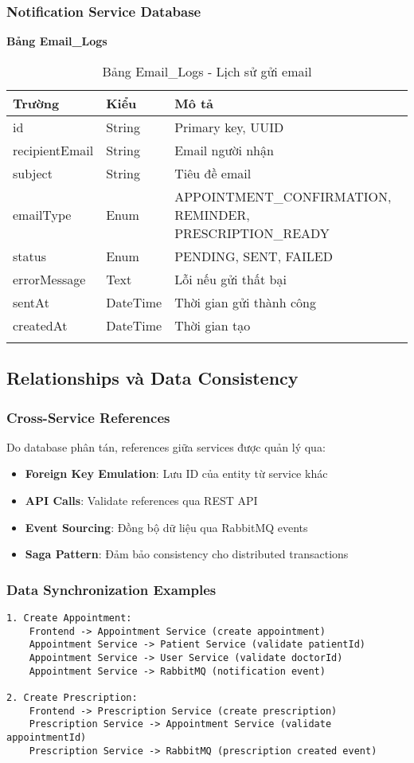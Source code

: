 \documentclass[12pt,a4paper]{report}
\begin{document}
\subsubsection{Notification Service Database}
\textbf{Bảng Email\_Logs}
\begin{longtable}{|p{3cm}|p{2cm}|p{8cm}|}
\hline
\textbf{Trường} & \textbf{Kiểu} & \textbf{Mô tả} \\
\hline
id & String & Primary key, UUID \\
\hline
recipientEmail & String & Email người nhận \\
\hline
subject & String & Tiêu đề email \\
\hline
emailType & Enum & APPOINTMENT\_CONFIRMATION, REMINDER, PRESCRIPTION\_READY \\
\hline
status & Enum & PENDING, SENT, FAILED \\
\hline
errorMessage & Text & Lỗi nếu gửi thất bại \\
\hline
sentAt & DateTime & Thời gian gửi thành công \\
\hline
createdAt & DateTime & Thời gian tạo \\
\hline
\caption{Bảng Email\_Logs - Lịch sử gửi email}
\end{longtable}

\subsection{Relationships và Data Consistency}

\subsubsection{Cross-Service References}
Do database phân tán, references giữa services được quản lý qua:
\begin{itemize}
    \item \textbf{Foreign Key Emulation}: Lưu ID của entity từ service khác
    \item \textbf{API Calls}: Validate references qua REST API
    \item \textbf{Event Sourcing}: Đồng bộ dữ liệu qua RabbitMQ events
    \item \textbf{Saga Pattern}: Đảm bảo consistency cho distributed transactions
\end{itemize}

\subsubsection{Data Synchronization Examples}
\begin{lstlisting}[language=text, caption=Example data flow between services]
1. Create Appointment:
    Frontend -> Appointment Service (create appointment)
    Appointment Service -> Patient Service (validate patientId)
    Appointment Service -> User Service (validate doctorId)
    Appointment Service -> RabbitMQ (notification event)

2. Create Prescription:
    Frontend -> Prescription Service (create prescription)
    Prescription Service -> Appointment Service (validate appointmentId)
    Prescription Service -> RabbitMQ (prescription created event)
\end{lstlisting}
\end{document}
